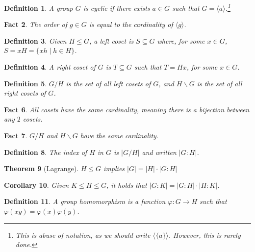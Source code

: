 \documentclass[a4paper,12pt]{article}
\theoremstyle{sltheorem}
\newtheorem{theorem}{Theorem}[section]
\newtheorem{definition}[theorem]{Definition}
\newtheorem{corollary}[theorem]{Corollary}
\newtheorem{fact}[theorem]{Fact}
\begin{document}
\begin{definition}
    A group $G$ is cyclic if there exists $a \in G$ such that $G = \langle a \rangle$.\footnote{This is abuse of notation, as we should write $\langle \{a\} \rangle$. However, this is rarely done.} 
\end{definition}

\begin{fact}
The order of $g \in G$ is equal to the cardinality of $\langle g \rangle$.
\end{fact}

\begin{definition}
    Given $H \leq G$, a \textit{left coset} is $S \subseteq G$ where, for some $x \in G$, $S = xH = \{xh \mid h \in H\}$.
\end{definition}

\begin{definition}
    A \textit{right} coset of $G$ is $T \subseteq G$ such that $T = Hx$, for some $x \in G$.
\end{definition}

\begin{definition}
    $G/H$ is the set of all left cosets of $G$, and $H \backslash G$ is the set of all right cosets of $G$.
\end{definition}

\begin{fact}
    All cosets have the same cardinality, meaning there is a bijection between any $2$ cosets.
\end{fact}

\begin{fact}
    $G/H$ and $H \backslash G$ have the same cardinality.
\end{fact}

\begin{definition}
    The \textit{index} of $H$ in $G$ is $|G / H|$ and written $|G : H|$.
\end{definition}

\begin{theorem}[Lagrange]
    $H \leq G$ implies $|G| = |H| \cdot |G : H|$
\end{theorem}

\begin{corollary}
    Given $K \leq H \leq G$, it holds that $|G : K| = |G : H| \cdot |H : K|$.
\end{corollary}

\begin{definition}
    A \textit{group homomorphism} is a function $\varphi: G \rightarrow H$ such that $\varphi(xy) = \varphi(x) \varphi(y)$.
\end{definition}
\end{document}
